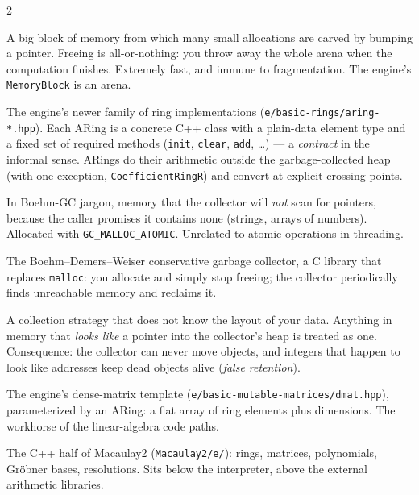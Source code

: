 \documentclass[11pt,oneside]{report}
\newcommand{\code}[1]{\textcolor{m2code}{\texttt{#1}}}
\newcommand{\file}[1]{\textcolor{m2file}{\texttt{#1}}}
\begin{document}
\begin{multicols}{2}\small
\begin{description}[style=nextline,itemsep=3pt]

\item[Arena (also: region, pool)] A big block of memory from which many small
allocations are carved by bumping a pointer. Freeing is all-or-nothing: you
throw away the whole arena when the computation finishes. Extremely fast, and
immune to fragmentation. The engine's \code{MemoryBlock} is an arena.

\item[ARing (``algebra ring'')] The engine's newer family of ring
implementations (\file{e/basic-rings/aring-*.hpp}). Each ARing is a concrete
C++ class with a plain-data element type and a fixed set of required methods
(\code{init}, \code{clear}, \code{add}, \ldots) --- a \emph{contract} in the
informal sense. ARings do their arithmetic outside the garbage-collected heap
(with one exception, \code{CoefficientRingR}) and convert at explicit
crossing points.

\item[Atomic allocation] In Boehm-GC jargon, memory that the collector will
\emph{not} scan for pointers, because the caller promises it contains none
(strings, arrays of numbers). Allocated with \code{GC\_MALLOC\_ATOMIC}. Unrelated
to atomic operations in threading.

\item[Boehm GC (bdwgc)] The Boehm--Demers--Weiser conservative garbage
collector, a C library that replaces \code{malloc}: you allocate and simply stop
freeing; the collector periodically finds unreachable memory and reclaims it.

\item[Conservative collection] A collection strategy that does not know the
layout of your data. Anything in memory that \emph{looks like} a pointer into
the collector's heap is treated as one. Consequence: the collector can never
move objects, and integers that happen to look like addresses keep dead objects
alive (\emph{false retention}).

\item[DMat] The engine's dense-matrix template
(\file{e/basic-mutable-matrices/dmat.hpp}), parameterized by an ARing: a flat
array of ring elements plus dimensions. The workhorse of the linear-algebra
code paths.

\item[Engine] The C++ half of Macaulay2 (\file{Macaulay2/e/}): rings,
matrices, polynomials, Gr\"obner bases, resolutions. Sits below the
interpreter, above the external arithmetic libraries.


\end{description}
\end{multicols}
\end{document}
